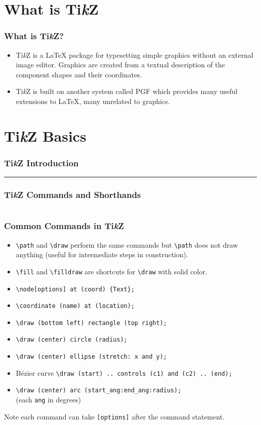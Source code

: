 \documentclass{beamer}
\newcommand{\samplecolumn}[2]{
	\begin{frame}
	\frametitle{#2}
	\begin{columns}[T]
		\begin{column}{0.5\textwidth}
			
		\end{column}
		\vrule
		\begin{column}{0.5\textwidth}
			\begin{minipage}{\linewidth}
				
			\end{minipage}
		\end{column}
	\end{columns}
	\end{frame}
}
\newcommand{\samplerow}[2]{
	\begin{frame}
	\frametitle{#2}
	
	\hrule
	\vspace*{4pt}
	\begin{minipage}{\linewidth}
		
	\end{minipage}
	\end{frame}
}
\let\oldLaTeX\LaTeX
\renewcommand{\LaTeX}{\oldLaTeX\xspace}
\newcommand{\TikZ}{Ti\textit{k}Z\xspace}
\begin{document}
	\section{What is \TikZ}
	\begin{frame}
		\frametitle{What is \TikZ?}
		\begin{itemize}
			\item \TikZ is a \LaTeX package for typesetting simple graphics without an external image editor. Graphics are created from a textual description of the component shapes and their coordinates.
			\item \TikZ is built on another system called PGF which provides many useful extensions to \LaTeX, many unrelated to graphics.
		\end{itemize}
	\end{frame}

	\section{\TikZ Basics}

	\samplerow{Sample-Tikz.tex}{\TikZ Introduction}
	\samplecolumn{Tikz-Shorthand.tex}{\TikZ Commands and Shorthands}
	
	\begin{frame}[fragile]
		\frametitle{Common Commands in \TikZ}
		\begin{itemize}
			\item \verb$\path$ and \verb$\draw$ perform the same commands but \verb$\path$ does not draw anything (useful for intermediate steps in construction).
			\item \verb$\fill$ and \verb$\filldraw$ are shortcuts for \verb$\draw$ with solid color. 
			\item \verb$\node[options] at (coord) {Text};$
			\item \verb$\coordinate (name) at (location);$
			\item \verb$\draw (bottom left) rectangle (top right);$
			\item \verb$\draw (center) circle (radius);$
			\item \verb$\draw (center) ellipse (stretch: x and y);$
			\item B\'ezier curve \verb$\draw (start) .. controls (c1) and (c2) .. (end);$
			\item \verb$\draw (center) arc (start_ang:end_ang:radius);$ \\ (each \verb$ang$ in degrees)
		\end{itemize}
		Note each command can take \verb$[options]$ after the command statement.
	\end{frame}
\end{document}
